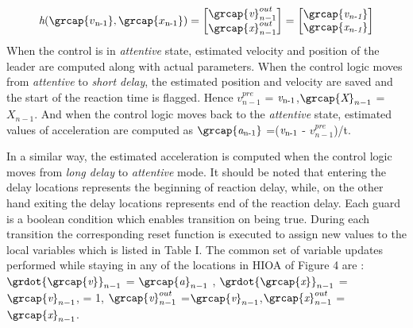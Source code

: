 {\begin{align}
\textit{h}(\grcap{v\textsubscript{n-1}},\grcap{x\textsubscript{n-1}}) =\begin{bmatrix} \grcap{\textit{v}}_{n-1}^{out} \\
\grcap{\textit{x}}_{n-1}^{out} \\ 
\end{bmatrix} = 
\begin{bmatrix} \grcap{\textit{v\textsubscript{n-1}}} \\
\grcap{\textit{x\textsubscript{n-1}}} \\ 
\end{bmatrix}
\end{align}
When the control is in \textit{attentive} state, estimated velocity and position of the leader are computed along with actual parameters. When the control logic moves from \textit{attentive} to \textit{short delay}, the estimated position and velocity are saved and the start of the reaction time is flagged. Hence $\textit{v}_{n-1}^{pre}$ = $\textit{v}\textsubscript{n-1}$,$\grcap{\textit{X}}_{n-1}$ = ${\textit{X}_{n-1}}$.
And when the control logic moves back to the \textit{attentive} state, estimated values of acceleration are computed as $\grcap{\textit{a}\textsubscript{n-1}}$ =($\textit{v}\textsubscript{n-1}$ -  $\textit{v}_{n-1}^{pre}$)/t. %

In a similar way, the estimated acceleration is computed when the control logic moves from \textit{long delay} to \textit{attentive} mode.
It should be noted that entering the delay locations represents the beginning of reaction delay,  while, on the other hand exiting the delay locations represents end of the reaction delay. Each guard is a boolean condition which enables transition on being true. During each transition the corresponding reset function is executed to assign new values to the local variables which is listed in Table I. The common set of variable updates performed while staying in any of the locations in HIOA of Figure 4 are :
 $\grdot{\grcap{\textit{v}}}_{n-1}$ = $\grcap{\textit{a}}_{n-1}$ , $\grdot{\grcap{\textit{x}}}_{n-1}$ = $\grcap{\textit{v}}_{n-1}$, = 1,  $\grcap{\textit{v}}_{n-1}^{out}$ =$\grcap{\textit{v}}_{n-1}$,$\grcap{\textit{x}}_{n-1}^{out}$ =$\grcap{\textit{x}}_{n-1}$.\\
 \begin{figure}
	

\end{figure}}
